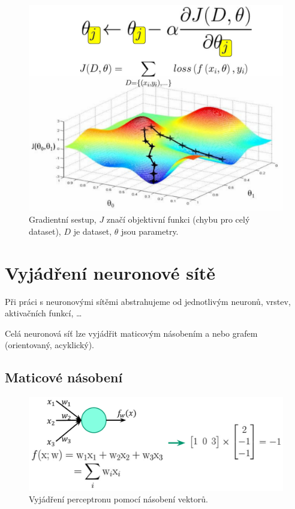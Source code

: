 \begin{figure}[H]
    \centering
    \includegraphics[width=0.8\linewidth]{gradient_descent.pdf}
    \caption{Gradientní sestup, $J$ značí objektivní funkci (chybu pro celý dataset), $D$ je dataset, $\theta$ jsou parametry.}
\end{figure}


\section{Vyjádření neuronové sítě}

\begin{compactitem}
    \item Při práci s neuronovými sítěmi abstrahujeme od jednotlivým neuronů, vrstev, aktivačních funkcí, \dots

    \item Celá neuronová síť lze vyjádřit maticovým násobením a nebo grafem (orientovaný, acyklický).
\end{compactitem}

\subsection{Maticové násobení}

\begin{figure}[H]
    \centering
    \includegraphics[width=0.65\linewidth]{nn_matrix_1.pdf}
    \caption{Vyjádření perceptronu pomocí násobení vektorů.}
\end{figure}

